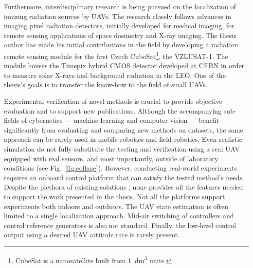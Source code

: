 \documentclass[a4paper,11pt,twoside,openright]{book}
\newcommand{\reffig}[1]{Fig.~\ref{#1}}
\begin{document}
Furthermore, interdisciplinary research is being pursued on the localization of ionizing radiation sources by \acp{UAV}.
The research closely follows advances in imaging pixel radiation detectors, initially developed for medical imaging, for remote sensing applications of space dosimetry and X-ray imaging.
The thesis author has made his initial contributions in the field by developing a radiation remote sensing module for the first Czech CubeSat\footnote{CubeSat is a nanosatellite built from \SI{1}{\deci\meter\cubed} units.}, the \acs{VZLU}SAT-1.
The module houses the Timepix\cite{llopart2007timepix} hybrid \acs{CMOS} detector developed at CERN in order to measure solar X-rays and background radiation in the \ac{LEO}.
One of the thesis's goals is to transfer the know-how to the field of small \aclp{UAV}.

Experimental verification of novel methods is crucial to provide objective evaluation and to support new publications.
Although the accompanying sub-fields of cybernetics --- machine learning and computer vision --- benefit significantly from evaluating and comparing new methods on datasets, the same approach can be rarely used in mobile robotics and field robotics.
Even realistic simulation do not fully substitute the testing and verification using a real \ac{UAV} equipped with real sensors, and most importantly, outside of laboratory conditions (see \reffig{fig:collage}).
However, conducting real-world experiments requires an onboard control platform that can satisfy the tested method's needs.
Despite the plethora of existing solutions \cite{sanchez2016aerostack, xiao2020xtdrone, furrer2016rotors, schmittle2018openuav, abeywardena2015design, mellado2013mavwork}, none provides all the features needed to support the work presented in the thesis.
Not all the platforms support experiments both indoors and outdoors.
The \ac{UAV} state estimation is often limited to a single localization approach.
Mid-air switching of controllers and control reference generators is also not standard.
Finally, the low-level control output using a desired \ac{UAV} attitude rate is rarely present.

\end{document}
